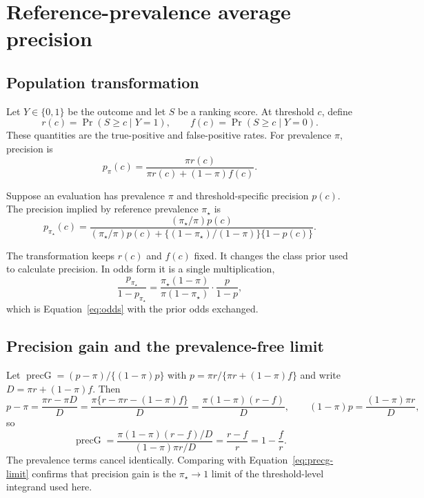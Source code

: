 \documentclass[11pt]{article}
\theoremstyle{remark}
\begin{document}

\newpage
\appendix

\section{Reference-prevalence average precision}
\label{app:prevalence}

\subsection{Population transformation}

Let $Y\in\{0,1\}$ be the outcome and let $S$ be a ranking score. At threshold $c$, define
\[
r(c)=\Pr(S\geq c\mid Y=1),
\qquad
f(c)=\Pr(S\geq c\mid Y=0).
\]
These quantities are the true-positive and false-positive rates. For prevalence $\pi$, precision is
\[
p_{\pi}(c)
=
\frac{\pi r(c)}{\pi r(c)+(1-\pi)f(c)}.
\]

Suppose an evaluation has prevalence $\pi$ and threshold-specific precision $p(c)$. The precision implied by reference prevalence $\pi_\star$ is
\begin{equation}
p_{\pi_\star}(c)
=
\frac{(\pi_\star/\pi)p(c)}
{(\pi_\star/\pi)p(c)
+
\{(1-\pi_\star)/(1-\pi)\}\{1-p(c)\}}.
\label{eq:precision-transform}
\end{equation}

The transformation keeps $r(c)$ and $f(c)$ fixed. It changes the class prior used to calculate precision. In odds form it is a single multiplication,
\[
\frac{p_{\pi_\star}}{1-p_{\pi_\star}}
=
\frac{\pi_\star(1-\pi)}{\pi(1-\pi_\star)}
\cdot
\frac{p}{1-p},
\]
which is Equation~\eqref{eq:odds} with the prior odds exchanged.

\subsection{Precision gain and the prevalence-free limit}
\label{app:precg}

Let $\operatorname{precG}=(p-\pi)/\{(1-\pi)p\}$ with $p=\pi r/\{\pi r+(1-\pi)f\}$ and write $D=\pi r+(1-\pi)f$. Then
\[
p-\pi
=
\frac{\pi r-\pi D}{D}
=
\frac{\pi\{r-\pi r-(1-\pi)f\}}{D}
=
\frac{\pi(1-\pi)(r-f)}{D},
\qquad
(1-\pi)p
=
\frac{(1-\pi)\pi r}{D},
\]
so
\[
\operatorname{precG}
=
\frac{\pi(1-\pi)(r-f)/D}{(1-\pi)\pi r/D}
=
\frac{r-f}{r}
=
1-\frac{f}{r}.
\]
The prevalence terms cancel identically. Comparing with Equation~\eqref{eq:precg-limit} confirms that precision gain is the $\pi_\star\to1$ limit of the threshold-level integrand used here.
\end{document}
